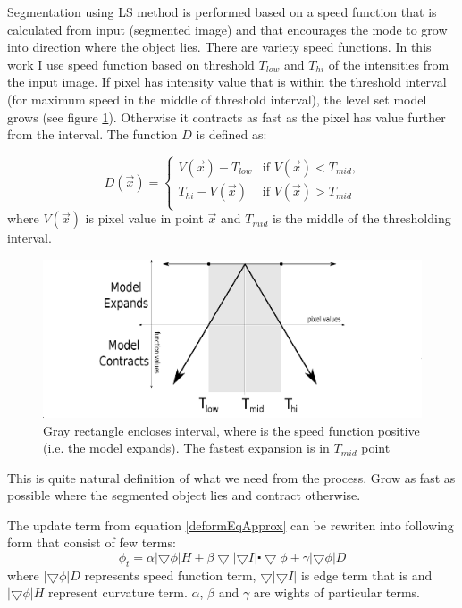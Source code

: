Segmentation using LS method is performed based on a speed function that is calculated from input (segmented image) and that encourages the mode to grow into direction where the object lies. There are variety speed functions. In this work I use speed function based on threshold $T_{low}$ and $T_{hi}$ of the intensities from the input image. If pixel has intensity value that is within the threshold interval (for maximum speed in the middle of threshold interval), the level set model grows (see figure \ref{fg:speedFunction}). Otherwise it contracts as fast as the pixel has value further from the interval. The function $D$ is defined as:

\begin{equation}
\label{eq:speedFunction}

D(\vec{x}) = 
\begin{cases}
V(\vec{x}) - T_{low} & \text{if $V(\vec{x}) < T_{mid}$,}\\
T_{hi} - V(\vec{x}) & \text{if $V(\vec{x}) > T_{mid}$}\\
\end{cases}
\end{equation}
where $V(\vec{x})$ is pixel value in point $\vec{x}$ and $T_{mid}$ is the middle of the thresholding interval.

\begin{figure}
    \centering
    \includegraphics[width=14cm]{data/speedFunction.eps}
    \caption[Graph of thresholding based speed function]{Gray rectangle encloses interval, where is the speed function positive (i.e. the model expands). The fastest expansion is in $T_{mid}$ point}
    \label{fg:speedFunction}
\end{figure}

This is quite natural definition of what we need from the process. Grow as fast as possible where the segmented object lies and contract otherwise.

The update term from equation \ref{deformEqApprox} can be rewriten into following form that consist of few terms:
\begin{equation}
\phi_t = \alpha |\bigtriangledown \phi| H + \beta \bigtriangledown|\bigtriangledown I|\centerdot \bigtriangledown \phi + \gamma|\bigtriangledown \phi|D
\end{equation}
where $|\bigtriangledown \phi|D$ represents speed function term, $\bigtriangledown|\bigtriangledown I|$ is edge term that is and $|\bigtriangledown \phi| H$ represent curvature term. $\alpha$, $\beta$ and $\gamma$ are wights of particular terms.

